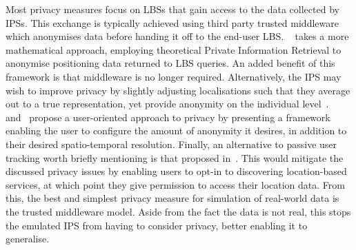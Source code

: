 Most privacy measures focus on LBSs that gain access to the data collected by IPSs.
This exchange is typically achieved using third party trusted middleware which anonymises data before handing it off to the end-user LBS.
~ takes a more mathematical approach, employing theoretical Private Information Retrieval to anonymise positioning data returned to LBS queries. 
An added benefit of this framework is that middleware is no longer required.
Alternatively, the IPS may wish to improve privacy by slightly adjusting localisations such that they average out to a true representation, yet provide anonymity on the individual level~\cite{Kido2005}.
~ and~ propose a user-oriented approach to privacy by presenting a framework enabling the user to configure the amount of anonymity it desires, in addition to their desired spatio-temporal resolution.
Finally, an alternative to passive user tracking worth briefly mentioning is that proposed in~\cite{Furfari2021}.
This would mitigate the discussed privacy issues by enabling users to opt-in to discovering location-based services, at which point they give permission to access their location data.
From this, the best and simplest privacy measure for simulation of real-world data is the trusted middleware model.
Aside from the fact the data is not real, this stops the emulated IPS from having to consider privacy, better enabling it to generalise.
